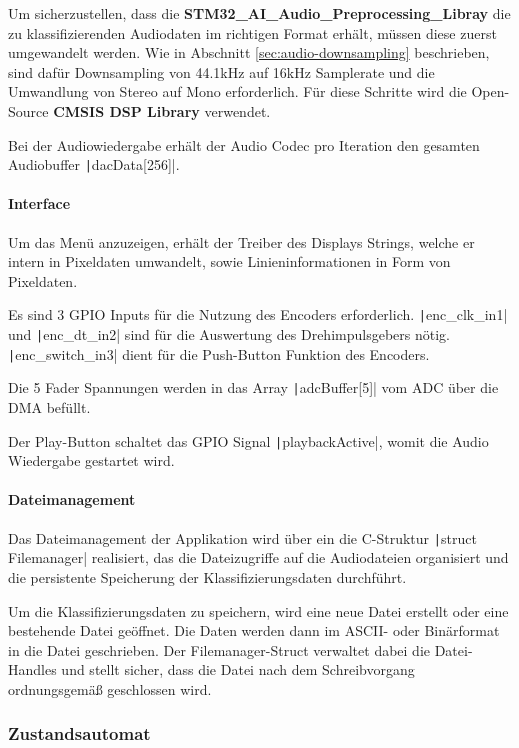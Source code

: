 Um sicherzustellen, dass die \textbf{STM32\_AI\_Audio\_Preprocessing\_Libray} die zu klassifizierenden Audiodaten im richtigen Format erhält, müssen diese zuerst umgewandelt werden. Wie in Abschnitt \ref{sec:audio-downsampling} beschrieben, sind dafür Downsampling von 44.1kHz auf 16kHz Samplerate und die Umwandlung von Stereo auf Mono erforderlich. Für diese Schritte wird die Open-Source \textbf{CMSIS DSP Library} verwendet.

Bei der Audiowiedergabe erhält der Audio Codec pro Iteration den gesamten Audiobuffer \texttt|dacData[256]|.

\paragraph{Interface}

Um das Menü anzuzeigen, erhält der Treiber des Displays Strings, welche er intern in Pixeldaten umwandelt, sowie Linieninformationen in Form von Pixeldaten. 

Es sind 3 GPIO Inputs für die Nutzung des Encoders erforderlich. \texttt|enc_clk_in1| und \texttt|enc_dt_in2| sind für die Auswertung des Drehimpulsgebers nötig. \texttt|enc_switch_in3| dient für die Push-Button Funktion des Encoders.

Die 5 Fader Spannungen werden in das Array \texttt|adcBuffer[5]| vom ADC über die DMA befüllt.

Der Play-Button schaltet das GPIO Signal \texttt|playbackActive|, womit die Audio Wiedergabe gestartet wird.

\paragraph{Dateimanagement}

Das Dateimanagement der Applikation wird über ein die C-Struktur \texttt|struct Filemanager| realisiert, das die Dateizugriffe auf die Audiodateien organisiert und die persistente Speicherung der Klassifizierungsdaten durchführt.  

Um die Klassifizierungsdaten zu speichern, wird eine neue Datei erstellt oder eine bestehende Datei geöffnet. Die Daten werden dann im ASCII- oder Binärformat in die Datei geschrieben. Der Filemanager-Struct verwaltet dabei die Datei-Handles und stellt sicher, dass die Datei nach dem Schreibvorgang ordnungsgemäß geschlossen wird.

\subsubsection{Zustandsautomat}

